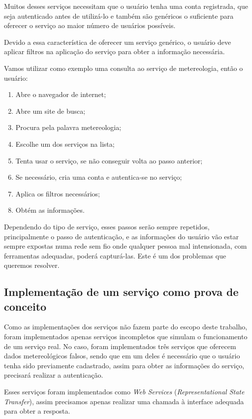 Muitos desses serviços necessitam que o usuário tenha uma conta registrada, que seja autenticado antes de utilizá-lo e também são genéricos o suficiente para oferecer o serviço ao maior número de usuários possíveis.

Devido a essa característica de oferecer um serviço genérico, o usuário deve aplicar filtros na aplicação do serviço para obter a informação necessária.

Vamos utilizar como exemplo uma consulta ao serviço de metereologia, então o usuário:
\begin{enumerate}
  \item Abre o navegador de internet;
  \item Abre um site de busca;
  \item Procura pela palavra metereologia;
  \item Escolhe um dos serviços na lista;
  \item Tenta usar o serviço, se não conseguir volta ao passo anterior;
  \item Se necessário, cria uma conta e autentica-se no serviço;
  \item Aplica os filtros necessários;
  \item Obtém as informações.
\end{enumerate}

Dependendo do tipo de serviço, esses passos serão sempre repetidos, principalmente o passo de autenticação, e as informações do usuário vão estar sempre expostas numa rede sem fio onde qualquer pessoa mal intensionada, com ferramentas adequadas, poderá capturá-las. Este é um dos problemas que queremos resolver.

\subsection{Implementação de um serviço como prova de conceito}
Como as implementações dos serviços não fazem parte do escopo deste trabalho, foram implementados apenas serviços incompletos que simulam o funcionamento de um serviço real. No caso, foram implementados três serviços que oferecem dados metereológicos falsos, sendo que em um deles é necessário que o usuário tenha sido previamente cadastrado, assim para obter as informações do serviço, precisará realizar a autenticação.

Esses serviços foram implementados como \textit{Web Services}  (\textit{Representational State Transfer}), assim precisamos apenas realizar uma chamada à interface adequada para obter a resposta.

